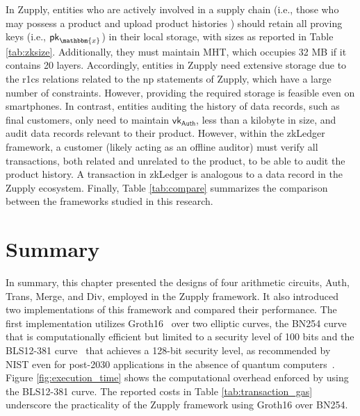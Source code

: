 In Zupply, entities who are actively involved in a supply chain (i.e., those who may possess a product and upload product histories ) should retain all proving keys (i.e., $\mathsf{pk}_\mathbbm{x}$) in their local storage, with sizes as reported in Table \ref{tab:zksize}. Additionally, they must maintain \textsf{MHT}, which occupies 32 MB if it contains 20 layers. Accordingly, entities in Zupply need extensive storage due to the \gls{r1cs} relations related to the \gls{np} statements of Zupply, which have a large number of constraints. However, providing the required storage is feasible even on smartphones. In contrast, entities auditing the history of data records, such as final customers, only need to maintain $\mathsf{vk}_\mathsf{Auth}$, less than a kilobyte in size, and audit data records relevant to their product. However, within the zkLedger framework, a customer (likely acting as an offline auditor) must verify all transactions, both related and unrelated to the product, to be able to audit the product history. A transaction in zkLedger is analogous to a data record in the Zupply ecosystem. Finally, Table \ref{tab:compare} summarizes the comparison between the frameworks studied in this research.

\section{Summary}

In summary, this chapter presented the designs of four arithmetic circuits, \textsf{Auth}, \textsf{Trans}, \textsf{Merge}, and \textsf{Div}, employed in the Zupply framework. It also introduced two implementations of this framework and compared their performance. The first implementation utilizes Groth16~\cite{Groth2016} over two elliptic curves, the BN254 curve~\cite{BNcurve} that  is computationally efficient but limited to a security level of 100 bits \cite{Barbulescu2019} and the BLS12-381 curve~\cite{BLS_curve2003} that achieves a 128-bit security level, as recommended by NIST even for post-2030 applications in the absence of quantum computers~\cite{NIST-SP-800-57-Part1-Rev5}. Figure \ref{fig:execution_time} shows the computational overhead enforced by using the BLS12-381 curve.  The reported costs in Table \ref{tab:transaction_gas} underscore the practicality of the Zupply framework using Groth16 over BN254.

